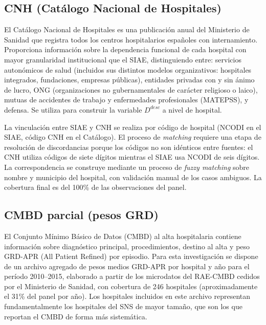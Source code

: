 \documentclass[12pt, a4paper, twoside, openright]{book}
\theoremstyle{plain}
\theoremstyle{definition}
\theoremstyle{remark}
\begin{document}
\subsection{CNH (Catálogo Nacional de Hospitales)}

El Catálogo Nacional de Hospitales es una publicación anual del Ministerio de Sanidad que registra todos los centros hospitalarios españoles con internamiento. Proporciona información sobre la dependencia funcional de cada hospital con mayor granularidad institucional que el SIAE, distinguiendo entre: servicios autonómicos de salud (incluidos sus distintos modelos organizativos: hospitales integrados, fundaciones, empresas públicas), entidades privadas con y sin ánimo de lucro, ONG (organizaciones no gubernamentales de carácter religioso o laico), mutuas de accidentes de trabajo y enfermedades profesionales (MATEPSS), y defensa. Se utiliza para construir la variable $D^{desc}$ a nivel de hospital.

La vinculación entre SIAE y CNH se realiza por código de hospital (NCODI en el SIAE, código CNH en el Catálogo). El proceso de \textit{matching} requiere una etapa de resolución de discordancias porque los códigos no son idénticos entre fuentes: el CNH utiliza códigos de siete dígitos mientras el SIAE usa NCODI de seis dígitos. La correspondencia se construye mediante un proceso de \textit{fuzzy matching} sobre nombre y municipio del hospital, con validación manual de los casos ambiguos. La cobertura final es del 100\% de las observaciones del panel.

\subsection{CMBD parcial (pesos GRD)}

El Conjunto Mínimo Básico de Datos (CMBD) al alta hospitalaria contiene información sobre diagnóstico principal, procedimientos, destino al alta y peso GRD-APR (All Patient Refined) por episodio. Para esta investigación se dispone de un archivo agregado de pesos medios GRD-APR por hospital y año para el período 2010--2015, elaborado a partir de los microdatos del RAE-CMBD cedidos por el Ministerio de Sanidad, con cobertura de 246 hospitales (aproximadamente el 31\% del panel por año). Los hospitales incluidos en este archivo representan fundamentalmente los hospitales del SNS de mayor tamaño, que son los que reportan el CMBD de forma más sistemática.
\end{document}
